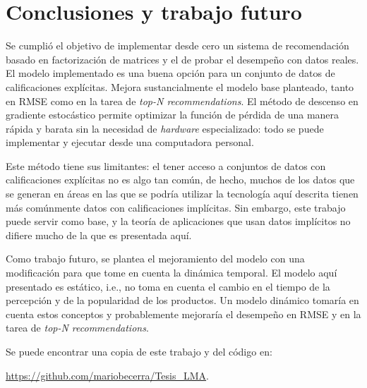 
\chapter{Conclusiones y trabajo futuro}

Se cumplió el objetivo de implementar desde cero un sistema de recomendación basado en factorización de matrices y el de probar el desempeño con datos reales. El modelo implementado es una buena opción para un conjunto de datos de calificaciones explícitas. Mejora sustancialmente el modelo base planteado, tanto en RMSE como en la tarea de \textit{top-N recommendations}. El método de descenso en gradiente estocástico permite optimizar la función de pérdida de una manera rápida y barata sin la necesidad de \textit{hardware} especializado: todo se puede implementar y ejecutar desde una computadora personal.

Este método tiene sus limitantes: el tener acceso a conjuntos de datos con calificaciones explícitas no es algo tan común, de hecho, muchos de los datos que se generan en áreas en las que se podría utilizar la tecnología aquí descrita tienen más comúnmente datos con calificaciones implícitas. Sin embargo, este trabajo puede servir como base, y la teoría de aplicaciones que usan datos implícitos no difiere mucho de la que es presentada aquí.

Como trabajo futuro, se plantea el mejoramiento del modelo con una modificación para que tome en cuenta la dinámica temporal. El modelo aquí presentado es estático, i.e., no toma en cuenta el cambio en el tiempo de la percepción y de la popularidad de los productos. Un modelo dinámico tomaría en cuenta estos conceptos y probablemente mejoraría el desempeño en RMSE y en la tarea de \textit{top-N recommendations}.

Se puede encontrar una copia de este trabajo y del código en:

\url{https://github.com/mariobecerra/Tesis_LMA}.
